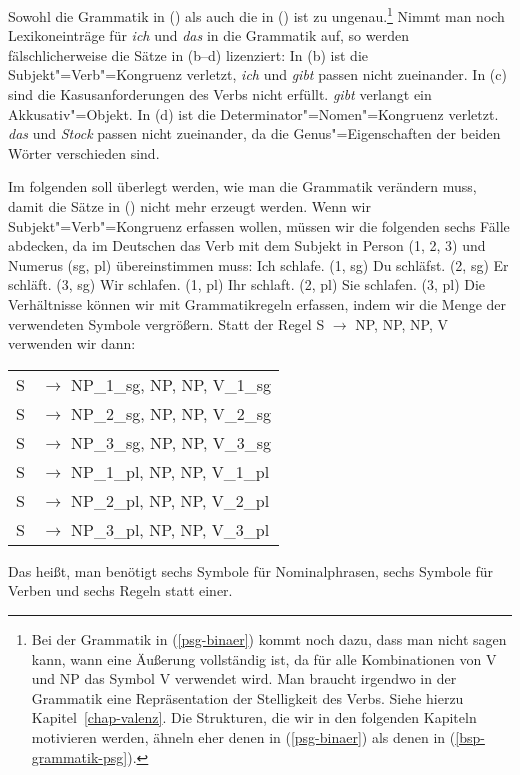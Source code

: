 \noindent
Sowohl die Grammatik in () als auch die in () ist zu ungenau.\footnote{
  Bei der Grammatik in (\ref{psg-binaer}) kommt noch dazu, dass man nicht sagen kann,
  wann eine Äußerung vollständig ist, da für alle Kombinationen von V und NP das Symbol
  V verwendet wird. Man braucht irgendwo in der Grammatik eine Repräsentation der Stelligkeit
  des Verbs. Siehe hierzu Kapitel~\ref{chap-valenz}. Die Strukturen, die wir in den folgenden
  Kapiteln motivieren werden, ähneln eher denen in (\ref{psg-binaer}) als denen in (\ref{bsp-grammatik-psg}).%
}
Nimmt man noch Lexikoneinträge für \emph{ich} und \emph{das} in die Grammatik auf, so werden
fälschlicherweise die Sätze in (b--d) lizenziert:
\eal
{}
\zl
In (b) ist die Subjekt"=Verb"=Kongruenz verletzt, \emph{ich} und \emph{gibt} passen
nicht zueinander. In (c) sind die Kasusanforderungen des Verbs nicht erfüllt.
\emph{gibt} verlangt ein Akkusativ"=Objekt. In (d) ist die Determinator"=Nomen"=Kongruenz
verletzt. \emph{das} und \emph{Stock} passen nicht zueinander, da die Genus"=Eigenschaften der
beiden Wörter verschieden sind.

Im folgenden soll überlegt werden, wie man die Grammatik verändern muss, damit die Sätze in ()
nicht mehr erzeugt werden. Wenn wir Subjekt"=Verb"=Kongruenz erfassen wollen, müssen
wir die folgenden sechs Fälle abdecken, da im Deutschen das Verb mit dem Subjekt in Person (1, 2, 3)
und Numerus (sg, pl) übereinstimmen muss:
\eal\jamwidth=8cm\relax
\ex Ich schlafe.  \jam(1, sg)
\ex Du schläfst.  \jam(2, sg)
\ex Er schläft.   \jam(3, sg)
\ex Wir schlafen. \jam(1, pl)
\ex Ihr schlaft.  \jam(2, pl)
\ex Sie schlafen. \jam(3, pl)
\zl
Die Verhältnisse können wir mit Grammatikregeln erfassen, indem wir die Menge der verwendeten
Symbole vergrößern. Statt der Regel S $\to$ NP, NP, NP, V verwenden wir dann:
\ea
\begin{tabular}[t]{@{}l@{ }l}
S  & $\to$ NP\_1\_sg, NP, NP, V\_1\_sg\\
S  & $\to$ NP\_2\_sg, NP, NP, V\_2\_sg\\
S  & $\to$ NP\_3\_sg, NP, NP, V\_3\_sg\\
S  & $\to$ NP\_1\_pl, NP, NP, V\_1\_pl\\
S  & $\to$ NP\_2\_pl, NP, NP, V\_2\_pl\\
S  & $\to$ NP\_3\_pl, NP, NP, V\_3\_pl\\
\end{tabular}
\z
Das heißt, man benötigt sechs Symbole für Nominalphrasen, sechs Symbole für Verben und 
sechs Regeln statt einer.

